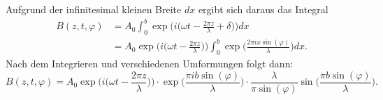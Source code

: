 Aufgrund der infinitesimal kleinen Breite $dx$ ergibt sich daraus das Integral
\begin{align}
  B(z,t,\varphi) &= A_0 \int_0^b \exp{\Bigg(i\bigg(\omega t - \frac{2 \pi z}{\lambda}
  + \delta \bigg)\Bigg)}dx \\
  &= A_0 \exp{\Bigg(i \bigg( \omega t - \frac{2\pi z}{\lambda}\bigg)\Bigg)}
  \int_0^b \exp{\bigg(\frac{2 \pi i x \sin{(\varphi)}}{\lambda}\bigg)}dx.
\end{align}
Nach dem Integrieren und verschiedenen Umformungen folgt dann:
\begin{equation}
  B(z,t,\varphi) = A_0 \exp{\Bigg(i \bigg( \omega t - \frac{2\pi z}{\lambda}\bigg)\Bigg)}
  \cdot \exp{\bigg(\frac{\pi i b \sin{(\varphi)}}{\lambda} \bigg)} \cdot
  \frac{\lambda}{\pi \sin{(\varphi)}} \sin{\bigg(\frac{\pi b \sin{(\varphi)}}{\lambda}\bigg)}.
\end{equation}
